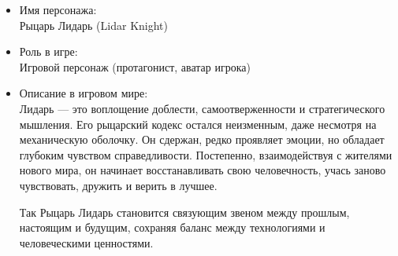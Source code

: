 \documentclass[a4paper,12pt]{article}
\begin{document}
\begin{itemize}
    \item Имя персонажа: \\
        Рыцарь Лидарь (Lidar Knight)
    \item Роль в игре: \\
        Игровой персонаж (протагонист,  аватар игрока)
    \item Описание в игровом мире:\\
        Лидарь — это воплощение доблести, самоотверженности и стратегического мышления. Его рыцарский кодекс остался неизменным, даже несмотря на механическую оболочку. Он сдержан, редко проявляет эмоции, но обладает глубоким чувством справедливости. Постепенно, взаимодействуя с жителями нового мира, он начинает восстанавливать свою человечность, учась заново чувствовать, дружить и верить в лучшее.

        Так Рыцарь Лидарь становится связующим звеном между прошлым, настоящим и будущим, сохраняя баланс между технологиями и человеческими ценностями.
        

\end{itemize}
\end{document}
